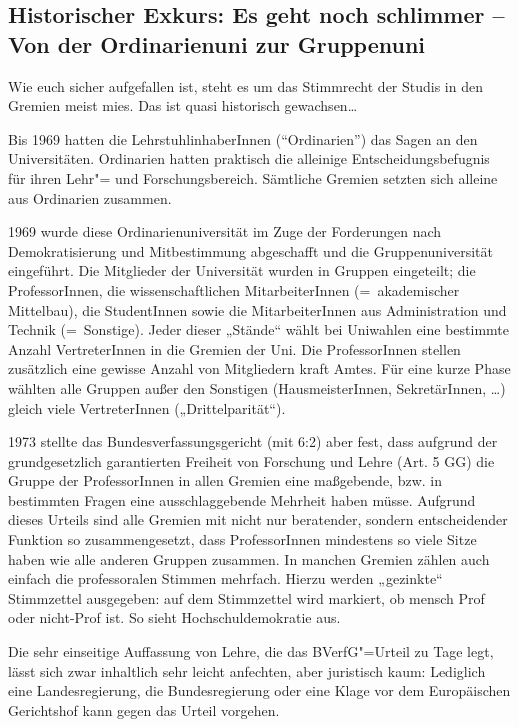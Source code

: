 \subsection{Historischer Exkurs: Es geht noch schlimmer -- Von der Ordinarienuni zur Gruppenuni}

Wie euch sicher aufgefallen ist, steht es um das Stimmrecht der Studis in den Gremien meist mies. Das ist quasi historisch gewachsen\dots

Bis 1969 hatten die LehrstuhlinhaberInnen ("`Ordinarien"') das Sagen an den Universitäten. Ordinarien hatten praktisch die alleinige Entscheidungsbefugnis
für ihren Lehr"= und Forschungsbereich. Sämtliche Gremien setzten sich alleine aus Ordinarien zusammen.

1969 wurde diese Ordinarienuniversität im Zuge der Forderungen nach Demokratisierung und Mitbestimmung abgeschafft und die Gruppenuniversität eingeführt. Die Mitglieder der Universität wurden in Gruppen eingeteilt; die ProfessorInnen, die wissenschaftlichen MitarbeiterInnen (=\ akademischer Mittelbau), die
StudentInnen sowie die MitarbeiterInnen aus Administration und Technik (=\ Sonstige). Jeder dieser „Stände“ wählt bei Uniwahlen eine bestimmte Anzahl VertreterInnen in die Gremien der Uni. Die ProfessorInnen stellen zusätzlich eine gewisse Anzahl von Mitgliedern kraft Amtes. Für eine kurze Phase wählten alle Gruppen außer den Sonstigen (HausmeisterInnen, SekretärInnen, \dots) gleich viele VertreterInnen („Drittelparität“).

1973 stellte das Bundesverfassungsgericht (mit 6:2) aber fest, dass aufgrund der grundgesetzlich garantierten Freiheit von Forschung und Lehre (Art. 5 GG) die Gruppe der ProfessorInnen in allen Gremien eine maßgebende, bzw. in bestimmten Fragen eine ausschlaggebende Mehrheit haben müsse. Aufgrund dieses Urteils sind alle Gremien mit nicht nur beratender, sondern entscheidender Funktion so zusammengesetzt, dass ProfessorInnen mindestens so viele Sitze haben wie alle anderen Gruppen zusammen. In manchen Gremien zählen auch einfach die professoralen Stimmen mehrfach. Hierzu werden „gezinkte“ Stimmzettel ausgegeben: auf dem Stimmzettel wird markiert, ob mensch Prof oder nicht-Prof ist. So sieht Hochschuldemokratie aus.

Die sehr einseitige Auffassung von Lehre, die das BVerfG"=Urteil zu Tage legt, lässt sich zwar inhaltlich sehr leicht anfechten, aber juristisch kaum: Lediglich eine Landesregierung, die Bundesregierung oder eine Klage vor dem Europäischen Gerichtshof kann gegen das Urteil vorgehen.
